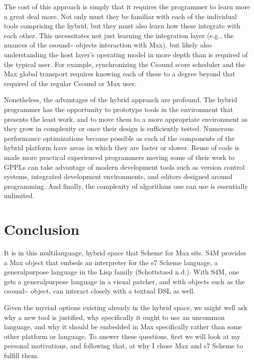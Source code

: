 \documentclass[letterpaper,10pt,english]{sphinxmanual}
\begin{document}
\sphinxAtStartPar
The cost of this approach is simply that it requires the programmer to learn
more \sphinxhyphen{} a great deal more. Not only must they be familiar with each of the individual
tools comprising the hybrid, but they must also learn how these integrate with each other.
This necessitates not just learning the integration layer (e.g., the nuances of the csound\textasciitilde{}
objects interaction with Max), but likely also understanding the host layer’s
operating model in more depth than is required of the typical user.
For example, synchronizing the Csound score scheduler and the Max global
transport requires knowing each of these to a degree beyond that required of the
regular Csound or Max user.

\sphinxAtStartPar
Nonetheless, the advantages of the hybrid approach are profound.
The hybrid programmer has the opportunity to prototype tools in the
environment that presents the least work, and to move them to a more
appropriate environment as they grow in complexity or once their design is sufficiently tested.
Numerous performance optimizations become possible as each of the
components of the hybrid platform have areas in which they are faster or slower.
Reuse of code is made more practical \sphinxhyphen{} experienced programmers
moving some of their work to GPPLs can take
advantage of modern development tools such as version control systems,
integrated development environments, and
editors designed around programming. And finally, the complexity
of algorithms one can use is essentially unlimited.


\section{Conclusion}
\label{\detokenize{background:conclusion}}
\sphinxAtStartPar
It is in this multi\sphinxhyphen{}language, hybrid space that Scheme for Max sits.
S4M provides a Max object that embeds an interpreter for
the s7 Scheme language, a general\sphinxhyphen{}purpose language in the Lisp family
(Schottstaed n.d.).
With S4M, one gets a general\sphinxhyphen{}purpose language in a visual patcher, and
with objects such as the csound\textasciitilde{} object, can interact closely with
a textual DSL as well.

\sphinxAtStartPar
Given the myriad options existing already in the hybrid space,
we might well ask why a new tool is justified, why
specifically it ought to use an uncommon language, and why it should
be embedded in Max specifically rather than some other platform or language.
To answer these questions, first we will look at my personal motivations,
and following that, at why I chose Max and s7 Scheme to fulfill them.
\end{document}
